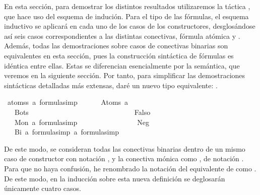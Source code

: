 \begin{isabellebody}
\begin{isamarkuptext}
En esta sección, para demostrar los distintos resultados utilizaremos la táctica , 
que hace uso del esquema de indución. Para el tipo de las fórmulas, el esquema inductivo
se aplicará en cada uno de los casos de los constructores, desglosándose
así seis casos correspondientes a las distintas conectivas, fórmula atómica y . Además, todas 
las demostraciones sobre casos de conectivas binarias son equivalentes en esta sección,
pues la construcción sintáctica de fórmulas es idéntica entre ellas. Estas se
diferencian esencialmente por la semántica, que veremos en la siguiente sección. Por tanto, para
simplificar las demostraciones sintácticas detalladas más extensas, daré un nuevo tipo equivalente: 
.%
\end{isamarkuptext}\isamarkuptrue%
\isamarkupfalse%
\ {\isacharparenleft}atoms{\isacharunderscore}s{\isacharcolon}\ {\isacharprime}a{\isacharparenright}\ formula{\isacharunderscore}simp\ {\isacharequal}\ \isanewline
\ \ \ \ Atom{\isacharunderscore}s\ {\isacharprime}a\isanewline
\ \ {\isacharbar}\ Bot{\isacharunderscore}s\ \ \ \ \ \ \ \ \ \ \ \ \ \ \ \ \ \ \ \ \ \ \ \ \ \ \ \ \ \ {\isacharparenleft}{\isachardoublequoteopen}Falso{\isachardoublequoteclose}{\isacharparenright}\ \ \isanewline
\ \ {\isacharbar}\ Mon\ {\isachardoublequoteopen}{\isacharprime}a\ formula{\isacharunderscore}simp{\isachardoublequoteclose}\ \ \ \ \ \ \ \ \ \ \ \ \ \ \ \ \ {\isacharparenleft}{\isachardoublequoteopen}Neg{\isachardoublequoteclose}{\isacharparenright}\isanewline
\ \ {\isacharbar}\ Bi\ {\isachardoublequoteopen}{\isacharprime}a\ formula{\isacharunderscore}simp{\isachardoublequoteclose}\ {\isachardoublequoteopen}{\isacharprime}a\ formula{\isacharunderscore}simp{\isachardoublequoteclose}\ \ \ \ {\isacharparenleft}\ {\isachardoublequoteopen}\isactrlbold {\isacharasterisk}{\isachardoublequoteclose}\ {}{}{\isacharparenright}%
\begin{isamarkuptext}%
De este modo, se consideran todas las conectivas binarias dentro de un mismo caso de constructor 
 con notación \isa{{\isacharasterisk}},
y la conectiva mónica como , de notación . Para que no haya confusión, he renombrado
la notación del equivalente de  como .
De este modo, en la inducción sobre esta nueva definición se deglosarán únicamente cuatro casos.


\end{isamarkuptext}
\end{isabellebody}

